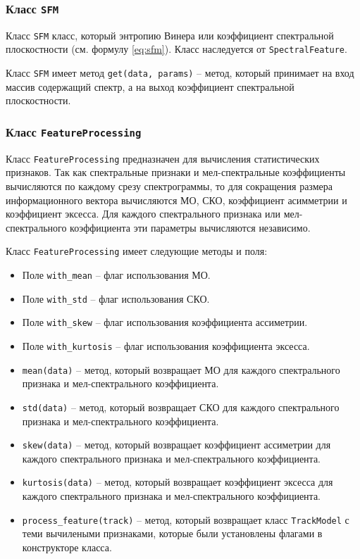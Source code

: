 \subsubsection{Класс \texttt{SFM}}

Класс \texttt{SFM} класс, который энтропию Винера или коэффициент спектральной плоскостности (см. формулу \ref{eq:sfm}). Класс наследуется от \texttt{SpectralFeature}.

Класс \texttt{SFM} имеет метод \texttt{get(data, params)} --  метод, который принимает на вход массив содержащий спектр, а на выход коэффициент спектральной плоскостности.



\subsubsection{Класс \texttt{FeatureProcessing}}

Класс \texttt{FeatureProcessing} предназначен для вычисления статистических признаков. Так как спектральные признаки и мел-спектральные коэффициенты вычисляются по каждому срезу спектрограммы, то для сокращения размера информационного вектора вычисляются МО, СКО, коэффициент асимметрии и коэффициент эксесса. Для каждого спектрального признака или мел-спектрального коэффициента эти параметры вычисляются независимо.

Класс \texttt{FeatureProcessing} имеет следующие методы и поля:

\begin{itemize}
\item{Поле \texttt{with\_mean} -- флаг использования МО.}
\item{Поле \texttt{with\_std} --  флаг использования СКО.}
\item{Поле \texttt{with\_skew} -- флаг использования коэффициента ассиметрии.}
\item{Поле \texttt{with\_kurtosis} -- флаг использования коэффициента эксесса.}
\item{\texttt{mean(data)} -- метод, который возвращает МО для каждого спектрального признака и мел-спектрального коэффициента.}
\item{\texttt{std(data)} -- метод, который возвращает СКО для каждого спектрального признака и мел-спектрального коэффициента. }
\item{\texttt{skew(data)} -- метод, который возвращает коэффициент ассиметрии для каждого спектрального признака и мел-спектрального коэффициента.}
\item{\texttt{kurtosis(data)} -- метод, который возвращает коэффициент эксесса для каждого спектрального признака и мел-спектрального коэффициента. }
\item{\texttt{process\_feature(track)} -- метод, который возвращает класс \texttt{TrackModel} с теми вычилеными признаками, которые были установлены флагами в конструкторе класса.}
\end{itemize}

